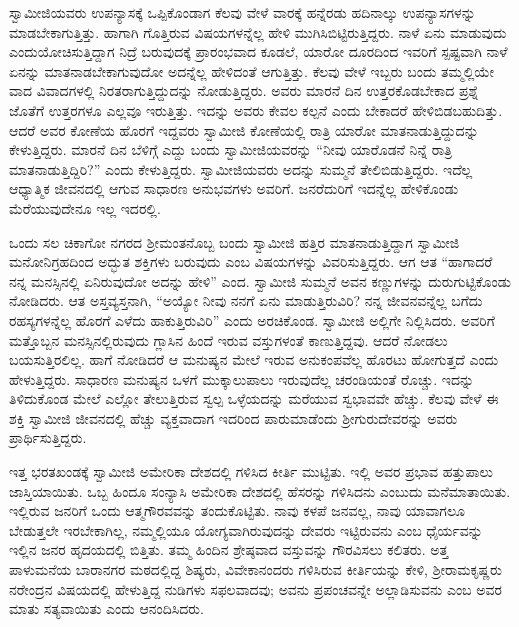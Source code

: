  ಸ್ವಾಮೀಜಿಯವರು ಉಪನ್ಯಾಸಕ್ಕೆ ಒಪ್ಪಿಕೊಂಡಾಗ ಕೆಲವು ವೇಳೆ ವಾರಕ್ಕೆ ಹನ್ನೆರಡು ಹದಿನಾಲ್ಕು ಉಪನ್ಯಾಸಗಳನ್ನು ಮಾಡಬೇಕಾಗುತ್ತಿತ್ತು. ಹಾಗಾಗಿ ಗೊತ್ತಿರುವ ವಿಷಯಗಳನ್ನೆಲ್ಲ ಹೇಳಿ ಮುಗಿಸಿಬಿಟ್ಟಿರುತ್ತಿದ್ದರು. ನಾಳೆ ಏನು ಮಾಡುವುದು ಎಂದು\break ಯೋಚಿಸುತ್ತಿದ್ದಾಗ ನಿದ್ರೆ ಬರುವುದಕ್ಕೆ ಪ್ರಾರಂಭವಾದ ಕೂಡಲೆ, ಯಾರೋ‌ ದೂರದಿಂದ ಇವರಿಗೆ ಸ್ಪಷ್ಟವಾಗಿ ನಾಳೆ ಏನನ್ನು ಮಾತನಾಡಬೇಕಾಗುವುದೋ ಅದನ್ನೆಲ್ಲ ಹೇಳಿದಂತೆ ಆಗುತ್ತಿತ್ತು. ಕೆಲವು ವೇಳೆ ಇಬ್ಬರು ಬಂದು ತಮ್ಮಲ್ಲಿಯೇ ವಾದ ವಿವಾದಗಳಲ್ಲಿ ನಿರತರಾಗುತ್ತಿದ್ದುದನ್ನು ನೋಡುತ್ತಿದ್ದರು. ಅವರು ಮಾರನೆ ದಿನ ಉತ್ತರಕೊಡಬೇಕಾದ ಪ್ರಶ್ನೆ ಜೊತೆಗೆ ಉತ್ತರಗಳೂ ಎಲ್ಲವೂ ಇರುತ್ತಿತ್ತು. ಇದನ್ನು ಅವರು ಕೇವಲ ಕಲ್ಪನೆ ಎಂದು ಬೇಕಾದರೆ ಹೇಳಿಬಿಡಬಹುದಿತ್ತು. ಆದರೆ ಅವರ ಕೋಣೆಯ ಹೊರಗೆ ಇದ್ದವರು ಸ್ವಾಮೀಜಿ ಕೋಣೆಯಲ್ಲಿ ರಾತ್ರಿ ಯಾರೋ ಮಾತನಾಡುತ್ತಿದ್ದುದನ್ನು ಕೇಳುತ್ತಿದ್ದರು. ಮಾರನೆ ದಿನ ಬೆಳಿಗ್ಗೆ ಎದ್ದು ಬಂದು ಸ್ವಾಮೀಜಿಯವರನ್ನು “ನೀವು ಯಾರೊಡನೆ ನಿನ್ನೆ ರಾತ್ರಿ ಮಾತನಾಡುತ್ತಿದ್ದಿರಿ?” ಎಂದು ಕೇಳುತ್ತಿದ್ದರು. ಸ್ವಾಮೀಜಿಯವರು ಅದನ್ನು ಸುಮ್ಮನೆ ತೇಲಿಬಿಡುತ್ತಿದ್ದರು. ಇದೆಲ್ಲ ಆಧ್ಯಾತ್ಮಿಕ ಜೀವನದಲ್ಲಿ ಆಗುವ ಸಾಧಾರಣ ಅನುಭವಗಳು ಅವರಿಗೆ. ಜನರೆದುರಿಗೆ ಇದನ್ನೆಲ್ಲ ಹೇಳಿಕೊಂಡು ಮೆರೆಯುವುದೇನೂ ಇಲ್ಲ ಇದರಲ್ಲಿ. 

 ಒಂದು ಸಲ ಚಿಕಾಗೋ ನಗರದ ಶ‍್ರೀಮಂತನೊಬ್ಬ ಬಂದು ಸ್ವಾಮೀಜಿ ಹತ್ತಿರ ಮಾತನಾಡುತ್ತಿದ್ದಾಗ ಸ್ವಾಮೀಜಿ ಮನೋನಿಗ್ರಹದಿಂದ ಅದ್ಭುತ ಶಕ್ತಿಗಳು ಬರುವುದು ಎಂಬ ವಿಷಯಗಳನ್ನು ವಿವರಿಸುತ್ತಿದ್ದರು. ಆಗ ಆತ “ಹಾಗಾದರೆ ನನ್ನ ಮನಸ್ಸಿನಲ್ಲಿ ಏನಿರುವುದೋ ಅದನ್ನು ಹೇಳಿ” ಎಂದ. ಸ್ವಾಮೀಜಿ ಸುಮ್ಮನೆ ಅವನ ಕಣ್ಣುಗಳನ್ನು ದುರುಗುಟ್ಟಿಕೊಂಡು ನೋಡಿದರು. ಆತ ಅಸ್ತವ್ಯಸ್ತನಾಗಿ, “ಅಯ್ಯೋ ನೀವು ನನಗೆ ಏನು ಮಾಡುತ್ತಿರುವಿರಿ? ನನ್ನ ಜೀವನವನ್ನೆಲ್ಲ ಬಗೆದು ರಹಸ್ಯಗಳನ್ನೆಲ್ಲ ಹೊರಗೆ ಎಳೆದು ಹಾಕುತ್ತಿರುವಿರಿ” ಎಂದು ಅರಚಿಕೊಂಡ. ಸ್ವಾಮೀಜಿ ಅಲ್ಲಿಗೇ ನಿಲ್ಲಿಸಿದರು. ಅವರಿಗೆ ಮತ್ತೊಬ್ಬನ ಮನಸ್ಸಿನಲ್ಲಿರುವುದು ಗ್ಲಾಸಿನ ಹಿಂದೆ ಇರುವ ವಸ್ತುಗಳಂತೆ ಕಾಣುತ್ತಿದ್ದವು. ಆದರೆ ನೋಡಲು ಬಯಸುತ್ತಿರಲಿಲ್ಲ. ಹಾಗೆ ನೋಡಿದರೆ ಆ ಮನುಷ್ಯನ ಮೇಲೆ ಇರುವ ಅನುಕಂಪವೆಲ್ಲ ಹೊರಟು ಹೋಗುತ್ತದೆ ಎಂದು ಹೇಳುತ್ತಿದ್ದರು. ಸಾಧಾರಣ ಮನುಷ್ಯನ ಒಳಗೆ ಮುಕ್ಕಾಲುಪಾಲು ಇರುವುದೆಲ್ಲ ಚರಂಡಿಯಂತೆ ರೊಚ್ಚು. ಇದನ್ನು ತಿಳಿದುಕೊಂಡ ಮೇಲೆ ಎಲ್ಲೋ ತೇಲುತ್ತಿರುವ ಸ್ವಲ್ಪ ಒಳ್ಳೆಯದನ್ನು ಮರೆಯುವ ಸ್ವಭಾವವೇ ಹೆಚ್ಚು. ಕೆಲವು ವೇಳೆ ಈ ಶಕ್ತಿ ಸ್ವಾಮೀಜಿ ಜೀವನದಲ್ಲಿ ಹೆಚ್ಚು ವ್ಯಕ್ತವಾದಾಗ ಇದರಿಂದ ಪಾರುಮಾಡೆಂದು ಶ‍್ರೀಗುರುದೇವರನ್ನು ಅವರು ಪ್ರಾರ್ಥಿಸುತ್ತಿದ್ದರು. 

 ಇತ್ತ ಭರತಖಂಡಕ್ಕೆ ಸ್ವಾಮೀಜಿ ಅಮೇರಿಕಾ ದೇಶದಲ್ಲಿ ಗಳಿಸಿದ ಕೀರ್ತಿ ಮುಟ್ಟಿತು. ಇಲ್ಲಿ ಅವರ ಪ್ರಭಾವ ಹತ್ತುಪಾಲು ಜಾಸ್ತಿಯಾಯಿತು. ಒಬ್ಬ ಹಿಂದೂ ಸಂನ್ಯಾಸಿ ಅಮೇರಿಕಾ ದೇಶದಲ್ಲಿ ಹೆಸರನ್ನು ಗಳಿಸಿದನು ಎಂಬುದು ಮನೆಮಾತಾಯಿತು. ಇಲ್ಲಿರುವ ಜನರಿಗೆ ಒಂದು ಆತ್ಮಗೌರವವನ್ನು ತಂದುಕೊಟ್ಟಿತು. ನಾವು ಕಳಪೆ ಜನವಲ್ಲ, ನಾವು ಯಾವಾಗಲೂ ಬೇಡುತ್ತಲೇ ಇರಬೇಕಾಗಿಲ್ಲ, ನಮ್ಮಲ್ಲಿಯೂ ಯೋಗ್ಯವಾಗಿರುವುದನ್ನು ದೇವರು ಇಟ್ಟಿರುವನು ಎಂಬ ಧೈರ್ಯವನ್ನು ಇಲ್ಲಿನ ಜನರ ಹೃದಯದಲ್ಲಿ ಬಿತ್ತಿತು. ತಮ್ಮ ಹಿಂದಿನ ಶ್ರೇಷ್ಠವಾದ ವಸ್ತುವನ್ನು ಗೌರವಿಸಲು ಕಲಿತರು. ಅತ್ತ ಪಾಳುಮನೆಯ ಬಾರಾನಗರ ಮಠದಲ್ಲಿದ್ದ ಶಿಷ್ಯರು, ವಿವೇಕಾನಂದರು ಗಳಿಸಿರುವ ಕೀರ್ತಿಯನ್ನು ಕೇಳಿ, ಶ‍್ರೀರಾಮಕೃಷ್ಣರು ನರೇಂದ್ರನ ವಿಷಯದಲ್ಲಿ ಹೇಳುತ್ತಿದ್ದ ನುಡಿಗಳು ಸಫಲವಾದವು; ಅವನು ಪ್ರಪಂಚವನ್ನೇ ಅಲ್ಲಾಡಿಸುವನು ಎಂಬ ಅವರ ಮಾತು ಸತ್ಯವಾಯಿತು ಎಂದು ಆನಂದಿಸಿದರು. 

